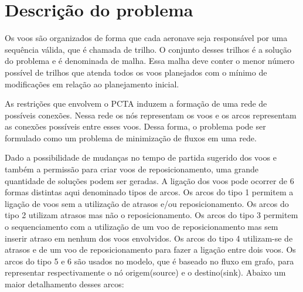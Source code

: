 \chapter{Descrição do problema}\label{cap:descprob}

  Os voos são organizados de forma que cada aeronave seja responsável por uma
  sequência válida, que é chamada de trilho.  O conjunto desses trilhos é a
  solução do problema e é denominada de malha. Essa malha deve conter o menor
  número possível de trilhos que atenda todos os voos planejados com o mínimo
  de modificações em relação ao planejamento inicial.
  
  As restrições que envolvem o PCTA induzem a formação de uma rede de possíveis
  conexões. Nessa rede os nós representam os voos e os arcos representam as
  conexões possíveis entre esses voos. Dessa forma, o problema pode ser
  formulado como um problema de minimização de fluxos em uma rede.
  
  Dado a possibilidade de mudanças no tempo de partida sugerido dos voos e
  também a permissão para criar voos de reposicionamento, uma grande quantidade
  de soluções podem ser geradas. A ligação dos voos pode ocorrer de 6 formas
  distintas aqui denominado tipos de arcos. Os arcos do tipo 1 permitem a
  ligação de voos sem a utilização de atrasos e/ou reposicionamento. Os arcos
  do tipo 2 utilizam atrasos mas não o reposicionamento. Os arcos do tipo 3
  permitem o sequenciamento com a utilização de um voo de reposicionamento mas
  sem inserir atraso em nenhum dos voos envolvidos. Os arcos do tipo 4
  utilizam-se de atrasos e de um voo de reposicionamento para fazer a ligação
  entre dois voos. Os arcos do tipo 5 e 6 são usados no modelo, que é baseado
  no fluxo em grafo, para representar respectivamente o nó origem(source) e o
  destino(sink). Abaixo um maior detalhamento desses arcos:

